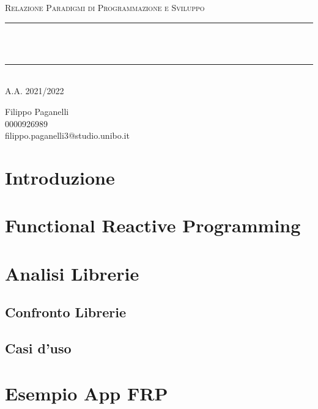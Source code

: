 \documentclass[12pt]{article}
\begin{document}

\begin{titlepage}

\newcommand{\HRule}{\rule{\linewidth}{0.5mm}}

\center

\textsc{\Large Relazione Paradigmi di Programmazione e Sviluppo}\\[0.5cm]

\HRule \\[0.4cm]
 \\
\HRule \\[0.4cm]
\center A.A. 2021/2022
\vfill

\begin{flushleft}
Filippo Paganelli \\ 0000926989 \\ filippo.paganelli3@studio.unibo.it
\end{flushleft}

\end{titlepage}

\tableofcontents

\newpage
\section{Introduzione}

\newpage
\section{Functional Reactive Programming}

\newpage
\section{Analisi Librerie}
\subsection{Confronto Librerie}
\subsection{Casi d'uso}

\newpage
\section{Esempio App FRP}
\end{document}
